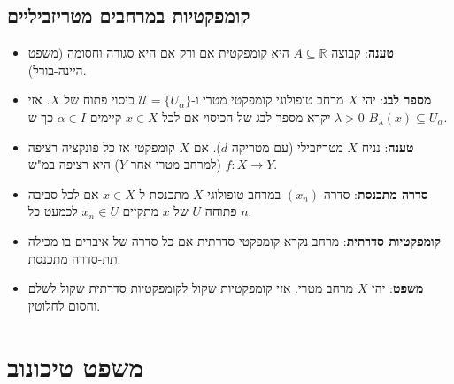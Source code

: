 \documentclass{tstextbook}
\begin{document}
\begin{summary}
\subsection{קומפקטיות במרחבים מטריזביליים}

  \begin{itemize}
    \item \textbf{טענה}: קבוצה \(A\subseteq \mathbb{R}\) היא קומפקטית אם ורק אם היא סגורה וחסומה (משפט היינה-בורל).
    \item \textbf{מספר לבג}: יהי \(X\) מרחב טופולוגי קומפקטי מטרי ו-\(\mathcal{U}=\{ U_{\alpha} \}\) כיסוי פתוח של \(X\). אזי \(\lambda> 0\) יקרא מספר לבג של הכיסוי אם לכל \(x \in X\) קיימים \(\alpha \in I\) כך ש-\(B_{\lambda}(x)\subseteq U_{\alpha}\).
    \item \textbf{טענה}: נניח \(X\) מטריזבילי (עם מטריקה \(d\)). אם \(X\) קומפקטי אז כל פונקציה רציפה \(f:X\to Y\) (למרחב מטרי אחר \(Y\)) היא רציפה במ"ש.
    \item \textbf{סדרה מתכנסת}: סדרה \((x_{n})\) במרחב טופולוגי \(X\) מתכנסת ל-\(x \in X\) אם לכל סביבה פתוחה \(U\) של \(x\) מתקיים \(x_{n}\in U\) לכמעט כל \(n\).
    \item \textbf{קומפקטיות סדרתית}: מרחב נקרא קומפקטי סדרתית אם כל סדרה של איברים בו מכילה תת-סדרה מתכנסת.
    \item \textbf{משפט}: יהי \(X\) מרחב מטרי. אזי קומפקטיות שקול לקומפקטיות סדרתית שקול לשלם וחסום לחלוטין.
  \end{itemize}
\end{summary}
\section{משפט טיכונוב}
\end{document}
